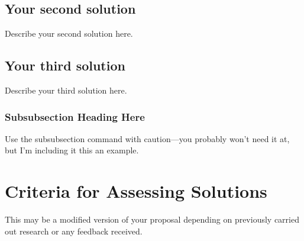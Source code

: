 \documentclass[peerreview]{IEEEtran}
\begin{document}
\subsection{Your second solution}
Describe your second solution here.
\subsection{Your third solution}
Describe your third solution here.
\subsubsection{Subsubsection Heading Here}
Use the subsubsection command with caution---you probably won't need it at, but I'm including it this an example.

\section{Criteria for Assessing Solutions} \label{sec:criteria}
This may be a modified version of your proposal depending on previously carried out research or any feedback received.
\end{document}
